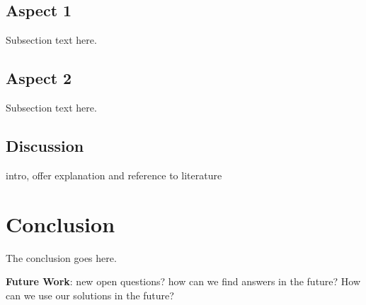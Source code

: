 \subsection{Aspect 1}\label{aspect-1}

Subsection text here.

\subsection{Aspect 2}\label{aspect-2}

Subsection text here.

\subsection{Discussion}\label{discussion}

intro, offer explanation and reference to literature

\section{Conclusion}\label{conclusion}

The conclusion goes here.

\textbf{Future Work}: new open questions? how can we find answers in the
future? How can we use our solutions in the future?
